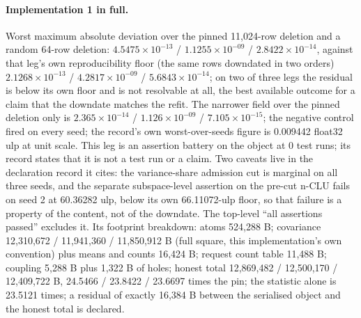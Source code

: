 \documentclass{article} %
\newcommand{\sci}[2]{\ensuremath{#1\times10^{#2}}}
\begin{document}
\paragraph{Implementation 1 in full.} Worst maximum absolute deviation over the pinned 11,024-row
deletion and a random 64-row deletion: \sci{4.5475}{-13} / \sci{1.1255}{-09} / \sci{2.8422}{-14},
against that leg's own reproducibility floor (the same rows downdated in two orders)
\sci{2.1268}{-13} / \sci{4.2817}{-09} / \sci{5.6843}{-14}; on two of three legs the residual is below
its own floor and is not resolvable at all, the best available outcome for a claim that the downdate matches the refit. The
narrower field over the pinned deletion only is \sci{2.365}{-14} / \sci{1.126}{-09} /
\sci{7.105}{-15}; the negative control fired on every seed; the record's own worst-over-seeds
figure is 0.009442 float32 ulp at unit scale. %
This leg is an assertion battery on the object at 0 test runs; its record states that it is not a test
run or a claim. Two caveats live in the declaration record it cites: the variance-share admission cut is
marginal on all three seeds, and the separate subspace-level assertion on the pre-cut n-CLU fails on
seed 2 at 60.36282 ulp, below its own 66.11072-ulp floor, so that failure is a property of the
content, not of the downdate. The top-level ``all assertions passed'' excludes it.
Its footprint breakdown: atoms 524,288 B; covariance 12,310,672 / 11,941,360 / 11,850,912 B (full
square, this implementation's own convention) plus means and counts 16,424 B; request count table
11,488 B; coupling 5,288 B plus 1,322 B of holes; honest total 12,869,482 / 12,500,170 / 12,409,722
B, 24.5466 / 23.8422 / 23.6697 times the pin; the statistic alone is 23.5121 times; a residual of %
exactly 16,384 B between the serialised object and the honest total is declared.
\end{document}
